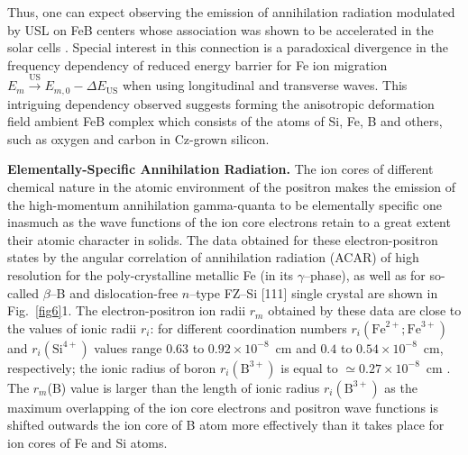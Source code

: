 \documentclass{ttp}
\begin{document}
Thus, one can expect observing the emission of annihilation radiation modulated by USL on FeB centers
whose association was shown to be accelerated in the solar cells \cite{Olikh2022:JMatSci}.
Special interest in this connection is a paradoxical divergence in the frequency dependency of reduced
energy barrier for Fe ion migration $E_m \xrightarrow{\mathrm{US}} E_{m,0}-\Delta E_\mathrm{US}$ 
when using longitudinal and transverse waves.
This intriguing dependency observed suggests forming the anisotropic deformation field ambient FeB complex
which consists of the atoms of Si, Fe, B and others, such as oxygen and carbon in Cz-grown silicon.


\noindent \textbf{Elementally-Specific Annihilation Radiation.}
The ion cores of different chemical nature in the atomic environment of the positron
makes the emission of the high-momentum annihilation gamma-quanta to be elementally specific one inasmuch
as the wave functions of the ion core electrons retain to a great extent their atomic character in solids.
The data obtained for these electron-positron states by the angular correlation of annihilation radiation (ACAR)
of high resolution for the poly-crystalline metallic Fe (in its $\gamma$--phase),
as well as for so-called $\beta$--B and dislocation-free $n$–type FZ–Si [111] single crystal are shown in Fig.~\ref{fig6}1.
The electron-positron ion radii $r_m$ obtained by these data are close to the values of ionic radii $r_i$:
for different coordination numbers $r_i(\mathrm{Fe}^{2+}; \mathrm{Fe}^{3+})$ and $r_i(\mathrm{Si}^{4+})$ values
range 0.63 to $0.92\times10^{−8}$~cm and $0.4$ to $0.54\times10^{−8}$~cm, respectively;
the ionic radius of boron $r_i(\mathrm{B}^{3+})$ is equal to $\simeq0.27\times10^{−8}$~cm \cite{Suchet1965,Rahm2016}.
The $r_m$(B) value is larger than the length of ionic radius $r_i(\mathrm{B}^{3+})$ as the maximum overlapping of the ion core
 electrons and positron wave functions \cite{Ferrell1956} is shifted outwards the ion core of B atom more effectively than it takes place for ion cores of Fe and Si atoms.


\end{document}
